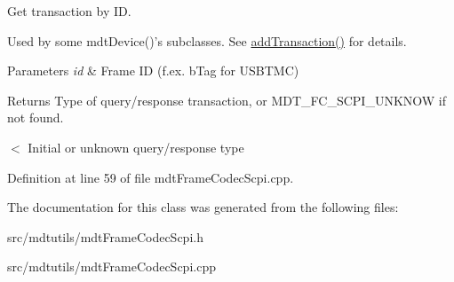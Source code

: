 Get transaction by ID. 

Used by some mdtDevice()'s subclasses. See \hyperlink{classmdt_frame_codec_scpi_a5287ff3f107ca10097cdb499e62f6906}{addTransaction()} for details.


\begin{DoxyParams}{Parameters}
{\em id} & Frame ID (f.ex. bTag for USBTMC) \\
\hline
\end{DoxyParams}
\begin{DoxyReturn}{Returns}
Type of query/response transaction, or MDT\_\-FC\_\-SCPI\_\-UNKNOW if not found. 
\end{DoxyReturn}


$<$ Initial or unknown query/response type 



Definition at line 59 of file mdtFrameCodecScpi.cpp.



The documentation for this class was generated from the following files:\begin{DoxyCompactItemize}
\item 
src/mdtutils/mdtFrameCodecScpi.h\item 
src/mdtutils/mdtFrameCodecScpi.cpp\end{DoxyCompactItemize}
